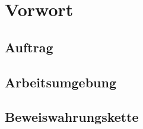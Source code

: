 \chapter{Vorwort}
\label{chap:prologue}

\section{Auftrag}
\label{sec:contract}
\blindtext

\section{Arbeitsumgebung}
\label{sec:env}
\blindtext

\section{Beweiswahrungskette}
\label{sec:cod}
\blindtext